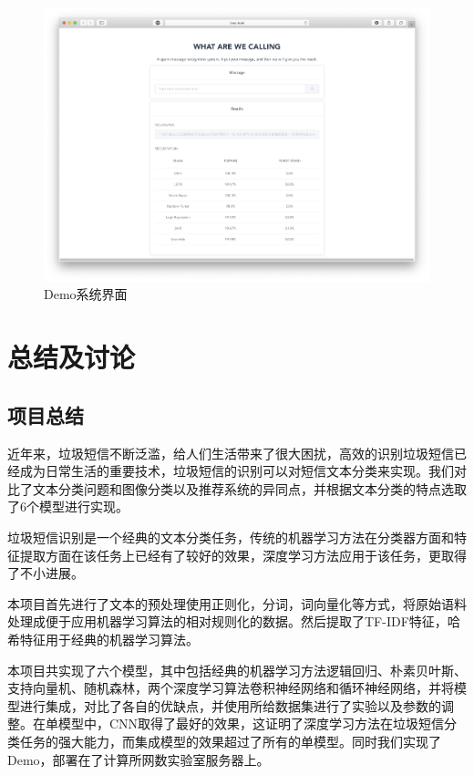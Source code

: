 \documentclass[a4paper]{article}
\begin{document}
\begin{figure}[ht]
	\centering
	\includegraphics[scale=0.4,width=1.0\linewidth]{demo.png}
	\caption{Demo系统界面}
	\label{fig:demo}
\end{figure}
\section{总结及讨论}
\subsection{项目总结}
近年来，垃圾短信不断泛滥，给人们生活带来了很大困扰，高效的识别垃圾短信已经成为日常生活的重要技术，垃圾短信的识别可以对短信文本分类来实现。我们对比了文本分类问题和图像分类以及推荐系统的异同点，并根据文本分类的特点选取了6个模型进行实现。

垃圾短信识别是一个经典的文本分类任务，传统的机器学习方法在分类器方面和特征提取方面在该任务上已经有了较好的效果，深度学习方法应用于该任务，更取得了不小进展。

本项目首先进行了文本的预处理使用正则化，分词，词向量化等方式，将原始语料处理成便于应用机器学习算法的相对规则化的数据。然后提取了TF-IDF特征，哈希特征用于经典的机器学习算法。

本项目共实现了六个模型，其中包括经典的机器学习方法逻辑回归、朴素贝叶斯、支持向量机、随机森林，两个深度学习算法卷积神经网络和循环神经网络，并将模型进行集成，对比了各自的优缺点，并使用所给数据集进行了实验以及参数的调整。在单模型中，CNN取得了最好的效果，这证明了深度学习方法在垃圾短信分类任务的强大能力，而集成模型的效果超过了所有的单模型。同时我们实现了Demo，部署在了计算所网数实验室服务器上。
\end{document}
